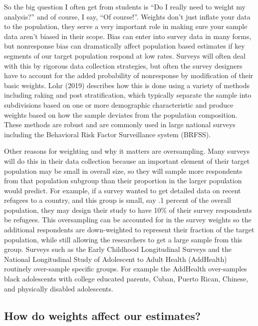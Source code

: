 \documentclass[
  letterpaper,
  DIV=11,
  numbers=noendperiod]{scrreprt}
\begin{document}
So the big question I often get from students is ``Do I really need to
weight my analysis?'' and of course, I say, ``Of course!''. Weights
don't just inflate your data to the population, they serve a very
important role in making sure your sample data aren't biased in their
scope. Bias can enter into survey data in many forms, but nonresponse
bias can dramatically affect population based estimates if key segments
of our target population respond at low rates. Surveys will often deal
with this by rigorous data collection strategies, but often the survey
designers have to account for the added probability of nonresponse by
modification of their basic weights. Lohr (2019) describes how this is
done using a variety of methods including raking and post
stratification, which typically separate the sample into subdivisions
based on one or more demographic characteristic and produce weights
based on how the sample deviates from the population composition. These
methods are robust and are commonly used in large national surveys
including the Behavioral Risk Factor Surveillance system (BRFSS).

Other reasons for weighting and why it matters are oversampling. Many
surveys will do this in their data collection because an important
element of their target population may be small in overall size, so they
will sample more respondents from that population subgroup than their
proportion in the larger population would predict. For example, if a
survey wanted to get detailed data on recent refugees to a country, and
this group is small, say .1 percent of the overall population, they may
design their study to have 10\% of their survey respondents be refugees.
This oversampling can be accounted for in the survey weights so the
additional respondents are down-weighted to represent their fraction of
the target population, while still allowing the researchers to get a
large sample from this group. Surveys such as the Early Childhood
Longitudinal Surveys and the National Longitudinal Study of Adolescent
to Adult Health (AddHealth) routinely over-sample specific groups. For
example the AddHealth over-samples black adolescents with college
educated parents, Cuban, Puerto Rican, Chinese, and physically disabled
adolescents.

\hypertarget{how-do-weights-affect-our-estimates}{%
\subsection{How do weights affect our
estimates?}\label{how-do-weights-affect-our-estimates}}
\end{document}

